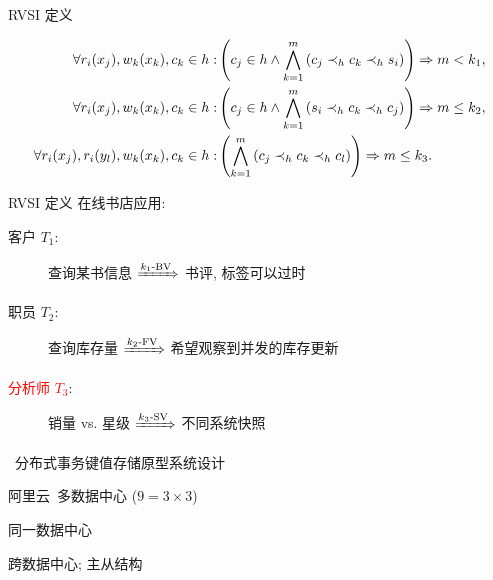 \begin{frame}{RVSI 定义}
  \begin{cdef}
	{\footnotesize
	\begin{align*}
	  \forall r_i(x_{j}), w_k(x_k), c_k \in h: & \left(c_j \in h \land \bigwedge_{k=1}^{m} \left(c_j \prec_{h}{} c_k \prec_{h}{} s_i \right)\right) \Rightarrow m < k_1, \\
	  \forall r_i(x_{j}), w_k(x_k), c_k \in h: & \left(c_j \in h \land \bigwedge_{k=1}^{m} \left(s_i \prec_{h}{} c_k \prec_{h}{} c_j \right)\right) \Rightarrow m \le k_2, \\
	  \forall r_i(x_j), r_i(y_l), w_k(x_k), c_k \in h: & \left(\bigwedge_{k=1}^{m} \left(c_j \prec_{h}{} c_k \prec_{h}{} c_l \right)\right) \Rightarrow m \le k_3.
	\end{align*}
  }
  \end{cdef}
\end{frame}
\begin{frame}{RVSI 定义}
  在线书店应用:
  \begin{description}
	\item[客户 $T_1$:] 查询某书信息 \textcolor{brown}{$\xRightarrow{k_1\text{-BV}}$} 书评, 标签可以过时
	\item[职员 $T_2$:] 查询库存量 \textcolor{brown}{$\xRightarrow{k_2\text{-FV}}$} 希望观察到并发的库存更新
	\item[\textcolor{red}{分析师 $T_3$}:] 销量 vs. 星级 \textcolor{brown}{$\xRightarrow{k_3\text{-SV}}$} 不同系统快照
  \end{description}
\end{frame}
\begin{frame}{\chameleon{}~\footnotemark[1]分布式事务键值存储原型系统设计}
  \begin{description}
	\item[系统架构:] 阿里云~\footnotemark[2]多数据中心 {\small ($9 = 3 \times 3$)} %
	\item<2->[数据分区:] 同一数据中心
	\item<2->[数据副本:] 跨数据中心; 主从结构
  \end{description}


\end{frame}
